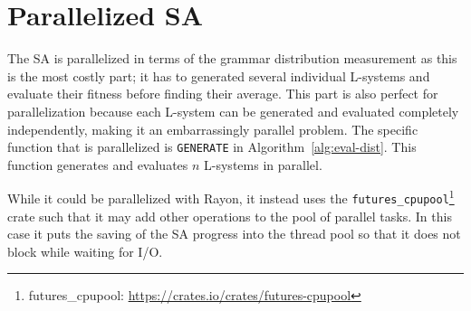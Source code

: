 \section[Parallelized SA]{Parallelized \gls{SA}}
The \gls{SA} is parallelized in terms of the grammar distribution measurement as this is the most costly part; it has to generated several individual \glspl{L-system} and evaluate their fitness before finding their average.
This part is also perfect for parallelization because each \gls{L-system} can be generated and evaluated completely independently, making it an embarrassingly parallel problem.
The specific function that is parallelized is \texttt{GENERATE} in Algorithm~\ref{alg:eval-dist}.
This function generates and evaluates $n$ \glspl{L-system} in parallel.

While it could be parallelized with Rayon, it instead uses the \texttt{futures\_cpupool}\footnote{futures\_cpupool: \url{https://crates.io/crates/futures-cpupool}} crate such that it may add other operations to the pool of parallel tasks.
In this case it puts the saving of the \gls{SA} progress into the thread pool so that it does not block while waiting for I/O.
